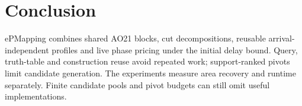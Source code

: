 \section{Conclusion}
ePMapping combines shared AO21 blocks, cut decompositions, reusable arrival-independent profiles and live phase pricing under the initial delay bound. Query, truth-table and construction reuse avoid repeated work; support-ranked pivots limit candidate generation. The experiments measure area recovery and runtime separately. Finite candidate pools and pivot budgets can still omit useful implementations.
